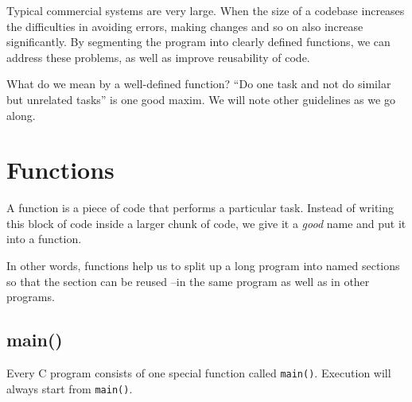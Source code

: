 \documentclass[11pt,a4paper]{article}
\author{TalentSprint}
\date{}
\begin{document}
Typical commercial systems are very large. When the size of a codebase increases the difficulties in avoiding errors, making changes and so on also increase significantly.  By segmenting the program into  clearly defined functions, we can address these problems, as well as improve reusability of code.

What do we mean by a well-defined function? ``Do one task and not do similar but unrelated tasks'' is one good maxim. We will note other guidelines as we go along.

\section*{Functions}
A function is a piece of code that performs a particular task. Instead of writing this block of code inside a larger chunk of code, we give it a \emph{good} name and put it into a function. 

In other words, functions help us to split up a long program into named sections so that the section can be reused --in the same program as well as in other programs.

\subsection*{main()}
Every C program consists of one special function called \texttt{main()}. Execution will always start from \texttt{main()}.
\end{document}
